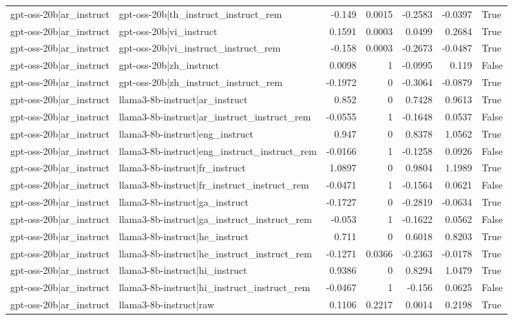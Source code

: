 \begin{table}
\begin{tabular}{l l r r r r l}
gpt-oss-20b|ar_instruct & gpt-oss-20b|th_instruct_instruct_rem & -0.149 & 0.0015 & -0.2583 & -0.0397 & True \\
gpt-oss-20b|ar_instruct & gpt-oss-20b|vi_instruct & 0.1591 & 0.0003 & 0.0499 & 0.2684 & True \\
gpt-oss-20b|ar_instruct & gpt-oss-20b|vi_instruct_instruct_rem & -0.158 & 0.0003 & -0.2673 & -0.0487 & True \\
gpt-oss-20b|ar_instruct & gpt-oss-20b|zh_instruct & 0.0098 & 1 & -0.0995 & 0.119 & False \\
gpt-oss-20b|ar_instruct & gpt-oss-20b|zh_instruct_instruct_rem & -0.1972 & 0 & -0.3064 & -0.0879 & True \\
gpt-oss-20b|ar_instruct & llama3-8b-instruct|ar_instruct & 0.852 & 0 & 0.7428 & 0.9613 & True \\
gpt-oss-20b|ar_instruct & llama3-8b-instruct|ar_instruct_instruct_rem & -0.0555 & 1 & -0.1648 & 0.0537 & False \\
gpt-oss-20b|ar_instruct & llama3-8b-instruct|eng_instruct & 0.947 & 0 & 0.8378 & 1.0562 & True \\
gpt-oss-20b|ar_instruct & llama3-8b-instruct|eng_instruct_instruct_rem & -0.0166 & 1 & -0.1258 & 0.0926 & False \\
gpt-oss-20b|ar_instruct & llama3-8b-instruct|fr_instruct & 1.0897 & 0 & 0.9804 & 1.1989 & True \\
gpt-oss-20b|ar_instruct & llama3-8b-instruct|fr_instruct_instruct_rem & -0.0471 & 1 & -0.1564 & 0.0621 & False \\
gpt-oss-20b|ar_instruct & llama3-8b-instruct|ga_instruct & -0.1727 & 0 & -0.2819 & -0.0634 & True \\
gpt-oss-20b|ar_instruct & llama3-8b-instruct|ga_instruct_instruct_rem & -0.053 & 1 & -0.1622 & 0.0562 & False \\
gpt-oss-20b|ar_instruct & llama3-8b-instruct|he_instruct & 0.711 & 0 & 0.6018 & 0.8203 & True \\
gpt-oss-20b|ar_instruct & llama3-8b-instruct|he_instruct_instruct_rem & -0.1271 & 0.0366 & -0.2363 & -0.0178 & True \\
gpt-oss-20b|ar_instruct & llama3-8b-instruct|hi_instruct & 0.9386 & 0 & 0.8294 & 1.0479 & True \\
gpt-oss-20b|ar_instruct & llama3-8b-instruct|hi_instruct_instruct_rem & -0.0467 & 1 & -0.156 & 0.0625 & False \\
gpt-oss-20b|ar_instruct & llama3-8b-instruct|raw & 0.1106 & 0.2217 & 0.0014 & 0.2198 & True \\

\end{tabular}
\end{table}
